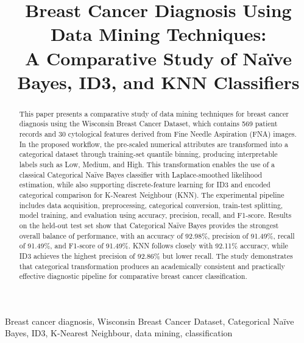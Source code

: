 \documentclass[conference]{IEEEtran}
\begin{document}
\title{Breast Cancer Diagnosis Using Data Mining Techniques:\\A Comparative Study of Na\"ive Bayes, ID3, and KNN Classifiers}

\author{
}

\maketitle

\begin{abstract}
This paper presents a comparative study of data mining techniques for breast cancer diagnosis using the Wisconsin Breast Cancer Dataset, which contains 569 patient records and 30 cytological features derived from Fine Needle Aspiration (FNA) images. In the proposed workflow, the pre-scaled numerical attributes are transformed into a categorical dataset through training-set quantile binning, producing interpretable labels such as Low, Medium, and High. This transformation enables the use of a classical Categorical Na\"ive Bayes classifier with Laplace-smoothed likelihood estimation, while also supporting discrete-feature learning for ID3 and encoded categorical comparison for K-Nearest Neighbour (KNN). The experimental pipeline includes data acquisition, preprocessing, categorical conversion, train-test splitting, model training, and evaluation using accuracy, precision, recall, and F1-score. Results on the held-out test set show that Categorical Na\"ive Bayes provides the strongest overall balance of performance, with an accuracy of 92.98\%, precision of 91.49\%, recall of 91.49\%, and F1-score of 91.49\%. KNN follows closely with 92.11\% accuracy, while ID3 achieves the highest precision of 92.86\% but lower recall. The study demonstrates that categorical transformation produces an academically consistent and practically effective diagnostic pipeline for comparative breast cancer classification.
\end{abstract}

\begin{IEEEkeywords}
Breast cancer diagnosis, Wisconsin Breast Cancer Dataset, Categorical Na\"ive Bayes, ID3, K-Nearest Neighbour, data mining, classification
\end{IEEEkeywords}
\end{document}
